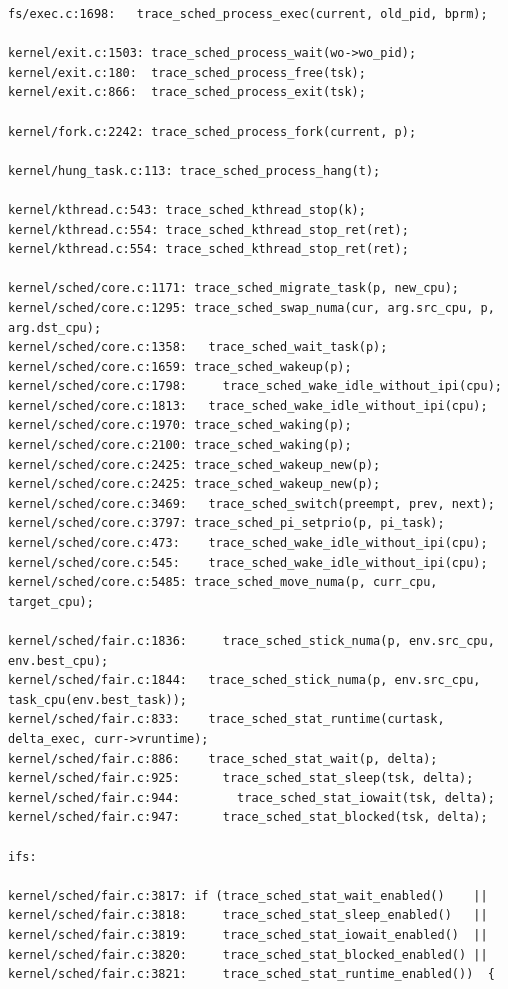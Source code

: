 \documentclass[10pt, oneside]{book}
\begin{document}
\begin{Verbatim}[xleftmargin=-2cm,fontsize=\footnotesize]
fs/exec.c:1698:   trace_sched_process_exec(current, old_pid, bprm);

kernel/exit.c:1503: trace_sched_process_wait(wo->wo_pid);
kernel/exit.c:180:  trace_sched_process_free(tsk);
kernel/exit.c:866:  trace_sched_process_exit(tsk);

kernel/fork.c:2242: trace_sched_process_fork(current, p);

kernel/hung_task.c:113: trace_sched_process_hang(t);

kernel/kthread.c:543: trace_sched_kthread_stop(k);
kernel/kthread.c:554: trace_sched_kthread_stop_ret(ret);
kernel/kthread.c:554: trace_sched_kthread_stop_ret(ret);

kernel/sched/core.c:1171: trace_sched_migrate_task(p, new_cpu);
kernel/sched/core.c:1295: trace_sched_swap_numa(cur, arg.src_cpu, p, arg.dst_cpu);
kernel/sched/core.c:1358:   trace_sched_wait_task(p);
kernel/sched/core.c:1659: trace_sched_wakeup(p);
kernel/sched/core.c:1798:     trace_sched_wake_idle_without_ipi(cpu);
kernel/sched/core.c:1813:   trace_sched_wake_idle_without_ipi(cpu);
kernel/sched/core.c:1970: trace_sched_waking(p);
kernel/sched/core.c:2100: trace_sched_waking(p);
kernel/sched/core.c:2425: trace_sched_wakeup_new(p);
kernel/sched/core.c:2425: trace_sched_wakeup_new(p);
kernel/sched/core.c:3469:   trace_sched_switch(preempt, prev, next);
kernel/sched/core.c:3797: trace_sched_pi_setprio(p, pi_task);
kernel/sched/core.c:473:    trace_sched_wake_idle_without_ipi(cpu);
kernel/sched/core.c:545:    trace_sched_wake_idle_without_ipi(cpu);
kernel/sched/core.c:5485: trace_sched_move_numa(p, curr_cpu, target_cpu);

kernel/sched/fair.c:1836:     trace_sched_stick_numa(p, env.src_cpu, env.best_cpu);
kernel/sched/fair.c:1844:   trace_sched_stick_numa(p, env.src_cpu, task_cpu(env.best_task));
kernel/sched/fair.c:833:    trace_sched_stat_runtime(curtask, delta_exec, curr->vruntime);
kernel/sched/fair.c:886:    trace_sched_stat_wait(p, delta);
kernel/sched/fair.c:925:      trace_sched_stat_sleep(tsk, delta);
kernel/sched/fair.c:944:        trace_sched_stat_iowait(tsk, delta);
kernel/sched/fair.c:947:      trace_sched_stat_blocked(tsk, delta);

ifs:

kernel/sched/fair.c:3817: if (trace_sched_stat_wait_enabled()    ||
kernel/sched/fair.c:3818:     trace_sched_stat_sleep_enabled()   ||
kernel/sched/fair.c:3819:     trace_sched_stat_iowait_enabled()  ||
kernel/sched/fair.c:3820:     trace_sched_stat_blocked_enabled() ||
kernel/sched/fair.c:3821:     trace_sched_stat_runtime_enabled())  {

\end{Verbatim}
\end{document}
